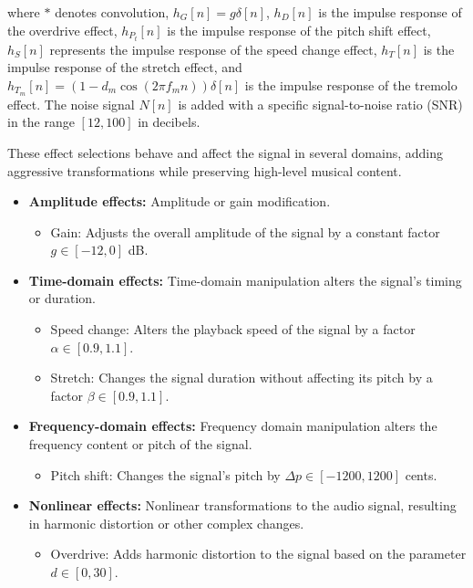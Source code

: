 where $\ast$ denotes convolution, $h_{G}[n] = g \delta[n]$, $h_{D}[n]$ is the impulse response of the overdrive effect, $h_{P_t}[n]$ is the impulse response of the pitch shift effect, $h_{S}[n]$ represents the impulse response of the speed change effect, $h_{T}[n]$ is the impulse response of the stretch effect, and $h_{T_m}[n] = (1 - d_m \cos(2 \pi f_m n))\delta[n]$ is the impulse response of the tremolo effect. The noise signal $N[n]$ is added with a specific signal-to-noise ratio (SNR) in the range $[12, 100]$ in decibels.

These effect selections behave and affect the signal in several domains, adding aggressive transformations while preserving high-level musical content.

\begin{itemize}
\item \textbf{Amplitude effects:} Amplitude or gain modification.
\begin{itemize}
    \item Gain: Adjusts the overall amplitude of the signal by a constant factor $g \in [-12, 0]$ dB.
\end{itemize}

\item \textbf{Time-domain effects:} Time-domain manipulation alters the signal's timing or duration.
\begin{itemize}
    \item Speed change: Alters the playback speed of the signal by a factor $\alpha \in [0.9, 1.1]$.
    \item Stretch: Changes the signal duration without affecting its pitch by a factor $\beta \in [0.9, 1.1]$.
\end{itemize}

\item \textbf{Frequency-domain effects:} Frequency domain manipulation alters the frequency content or pitch of the signal.
\begin{itemize}
    \item Pitch shift: Changes the signal's pitch by $\Delta p \in [-1200, 1200]$ cents.
\end{itemize}

\item \textbf{Nonlinear effects:} Nonlinear transformations to the audio signal, resulting in harmonic distortion or other complex changes.
\begin{itemize}
    \item Overdrive: Adds harmonic distortion to the signal based on the parameter $d \in [0, 30]$.
\end{itemize}


\end{itemize}
